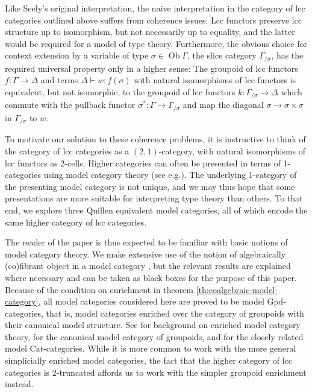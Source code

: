 \documentclass[a4paper]{article}
\theoremstyle{remark}
\theoremstyle{definition}
\begin{document}
Like Seely's original interpretation, the naive interpretation in the category of lcc categories outlined above suffers from coherence issues:
Lcc functors preserve lcc structure up to isomorphism, but not necessarily up to equality, and the latter would be required for a model of type theory.
Furthermore, the obvious choice for context extension by a variable of type $\sigma \in \operatorname{Ob} \Gamma$, the slice category $\Gamma_{/ \sigma}$, has the required universal property only in a higher sense:
The groupoid of lcc functors $f : \Gamma \rightarrow \Delta$ and terms $\Delta \vdash w : f(\sigma)$ with natural isomorphisms of lcc functors is equivalent, but not isomorphic, to the groupoid of lcc functors $k : \Gamma_{/ \sigma} \rightarrow \Delta$ which commute with the pullback functor $\sigma^* : \Gamma \rightarrow \Gamma_{/ \sigma}$ and map the diagonal $\sigma \rightarrow \sigma \times \sigma$ in $\Gamma_{/ \sigma}$ to $w$.

To motivate our solution to these coherence problems, it is instructive to think of the category of lcc categories as a $(2, 1)$-category, with natural isomorphisms of lcc functors as 2-cells.
Higher categories can often be presented in terms of 1-categories using model category theory (see e.g.\@ \cite{hirschhorn}).
The underlying 1-category of the presenting model category is not unique, and we may thus hope that some presentations are more suitable for interpreting type theory than others.
To that end, we explore three Quillen equivalent model categories, all of which encode the same higher category of lcc categories.

The reader of the paper is thus expected to be familiar with basic notions of model category theory.
We make extensive use of the notion of algebraically (co)fibrant object in a model category \cite{algebraic-models,coalgebraic-models}, but the relevant results are explained where necessary and can be taken as black boxes for the purpose of this paper.
Because of the condition on enrichment in theorem \ref{th:coalgebraic-model-category}, all model categories considered here are proved to be model $\mathrm{Gpd}$-categories, that is, model categories enriched over the category of groupoids with their canonical model structure.
See \cite{enriched-model-cats} for background on enriched model category theory, \cite{groupoid-model-cat} for the canonical model category of groupoids, and \cite{homotopy-theoretic-aspects} for the closely related model $\mathrm{Cat}$-categories.
While it is more common to work with the more general simplicially enriched model categories, the fact that the higher category of lcc categories is 2-truncated affords us to work with the simpler groupoid enrichment instead.
\end{document}
